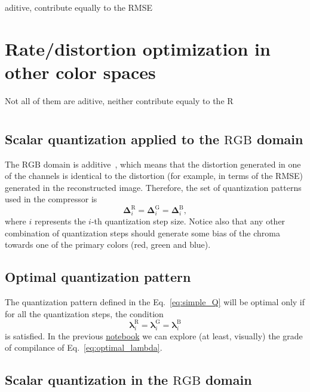   
aditive, contribute equally to the RMSE
  
\section{Rate/distortion optimization in other color spaces}

Not all of them are aditive, neither contribute equaly to the R

\section{}

\subsection{Scalar quantization applied to the $\text{RGB}$ domain}
The $\text{RGB}$ domain is additive~\cite{burger2016digital}, which
means that the distortion generated in one of the channels is
identical to the distortion (for example, in terms of the RMSE)
generated in the reconstructed image. Therefore, the set of
quantization patterns used in the compressor is
\begin{equation}
  \mathbf{\Delta}^{\text{R}}_i = \mathbf{\Delta}^{\text{G}}_i =
  \mathbf{\Delta}^{\text{B}}_i,
  \label{eq:simple_Q}
\end{equation}
where $i$ represents the $i$-th quantization step size.  Notice also
that any other combination of quantization steps should generate some
bias of the chroma towards one of the primary colors (red, green and
blue).

\subsection{Optimal quantization pattern}
\label{sec:optimal_RD}
The quantization pattern defined in the Eq.~\eqref{eq:simple_Q} will
be optimal only if for all the quantization steps, the condition
\begin{equation}
  \mathbf{\lambda}^{\text{R}}_i = \mathbf{\lambda}^{\text{G}}_i =
  \mathbf{\lambda}^{\text{B}}_i
  \label{eq:optimal_lambda}
\end{equation}
is satisfied. In the previous
\href{https://github.com/Sistemas-Multimedia/Sistemas-Multimedia.github.io/blob/master/contents/RGB_SQ/RGB_SQ.ipynb}{notebook}
we can explore (at least, visually) the grade of compilance of
Eq.~\eqref{eq:optimal_lambda}.

\subsection{Scalar quantization in the $\text{RGB}$ domain}


